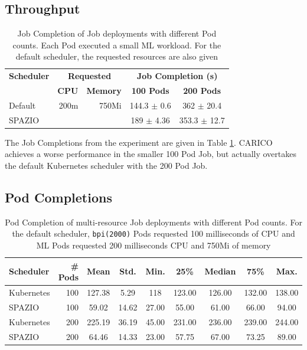 \subsection{Throughput}
\begin{table}[H]
\centering
    \begin{tabular}{|l|r|r|c|c|}
    \hline
    \textbf{Scheduler} & \multicolumn{2}{c|}{\textbf{Requested}} &
        \multicolumn{2}{c|}{\textbf{Job Completion (s)}} \\ \cline{2-5}
    &  \textbf{CPU} & \textbf{Memory} & \textbf{100 Pods} & \textbf{200 Pods} \\
    \hline
        Default & 200m & 750Mi & 144.3 $\pm$ 0.6 & 362 $\pm$ 20.4\\
        SPAZIO &  &  & 189 $\pm$ 4.36 & 353.3 $\pm$ 12.7 \\
    \hline
    \end{tabular}
    \caption{Job Completion of Job deployments with different Pod counts. Each
    Pod executed a small ML workload. For the default scheduler, the requested
    resources are also given}
    \label{tab:ml-throughput}
\end{table}
The Job Completions from the experiment are given in Table
\ref{tab:ml-throughput}. CARICO achieves a worse performance in the smaller 100
Pod Job, but actually overtakes the default Kubernetes scheduler with the 200
Pod Job.

\subsection{Pod Completions}
\begin{table}[H]
\centering
    \begin{tabular}{|l|r|c|c|c|c|c|c|c|}
    \hline
        \bfseries Scheduler & \bfseries \# Pods & \bfseries Mean & \bfseries Std. &
        \bfseries Min. & \bfseries 25\% & \bfseries Median & \bfseries 75\% & \bfseries Max. \\
    \hline
        Kubernetes & 100 & 127.38 & 5.29 & 118 & 123.00 & 126.00 & 132.00 &
        138.00 \\
        SPAZIO & 100 & 59.02 & 14.62 & 27.00 & 55.00 & 61.00 & 66.00 & 94.00 \\
        Kubernetes & 200 & 225.19 & 36.19 & 45.00 & 231.00 & 236.00 & 239.00 &
        244.00\\
        SPAZIO & 200 & 64.46 & 14.33 & 23.00 & 57.75 & 67.00 & 73.25 & 89.00 \\
    \hline
    \end{tabular}
    \caption{Pod Completion of multi-resource Job deployments with different Pod
    counts. For the default scheduler, \texttt{bpi(2000)} Pods requested 100
    milliseconds of CPU and ML Pods requested 200 milliseconds CPU and 750Mi of
    memory}
    \label{tab:mem-pod-completions}
\end{table}

